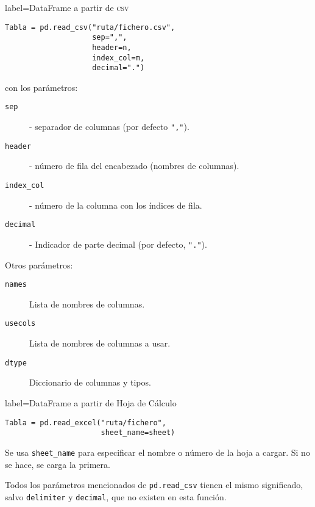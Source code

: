 \begin{contentbox}{label=DataFrame a partir de \textsc{csv}}
    \begin{lstlisting}
Tabla = pd.read_csv("ruta/fichero.csv",
                    sep=",",
                    header=n,
                    index_col=m,
                    decimal=".")
    \end{lstlisting}
    
    con los parámetros:
    \begin{description}
    \item[\texttt{sep}] - separador de columnas (por defecto \lstinline!","!).
    \item[\texttt{header}] -  número de fila del encabezado (nombres de columnas).
    \item[\texttt{index\_col}] - número de la columna con los índices de fila.
    \item[\texttt{decimal}] - Indicador de parte decimal (por defecto, \lstinline!"."!).
    \end{description}
    
    Otros parámetros:
    \begin{description}
    \item[\texttt{names}] Lista de nombres de columnas.
    \item[\texttt{usecols}] Lista de nombres de columnas a usar.
    \item[\texttt{dtype}] Diccionario de columnas y tipos.
    \end{description}
\end{contentbox}

\begin{contentbox}{label=DataFrame a partir de Hoja de Cálculo}
    \begin{lstlisting}
Tabla = pd.read_excel("ruta/fichero",
                      sheet_name=sheet)
    \end{lstlisting}
    
    Se usa \lstinline!sheet_name! para especificar el nombre o número de la hoja a cargar. Si no se hace, se carga la primera.
    
    Todos los parámetros mencionados de \lstinline!pd.read_csv! tienen el mismo significado, salvo \texttt{delimiter} y \texttt{decimal}, que no existen en esta función.
\end{contentbox}

